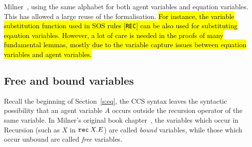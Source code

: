 
 Milner~\cite{Mil89}, using the
same alphabet for both agent variables and equation variables.
This has allowed a large reuse of the \univariate formalisation. \hl{For instance, 
the variable
substitution function used in SOS rules [\texttt{REC}] can be also
used for substituting eqaution variables.
However, a lot of care is needed in the proofs of many
fundamental lemmas, mostly due to the variable capture issues between
equation variables and agent variables.}


\subsection{Free and bound variables}

Recall the beginning of Section~\ref{s:eq},
the CCS syntax leaves the syntactic possibility that an
agent variable $A$ occurs outside the recursion operator of the same
variable. In Milner's original book chapter~\cite{milner1990operational}, the
variables which occur in Recursion (such as $X$ in ${\tt rec}\: X . E$) are
called \emph{bound} variables, while those which occur unbound are called
\emph{free} variables. 



